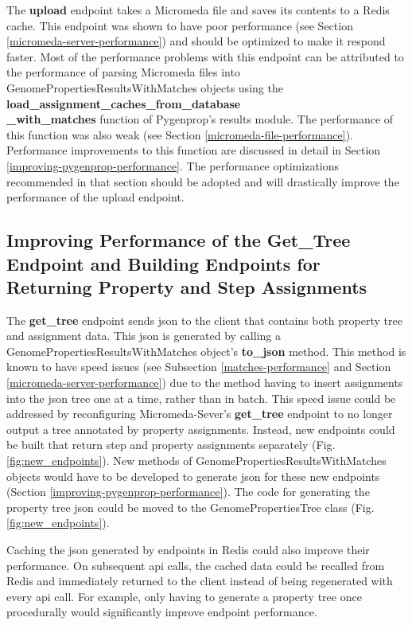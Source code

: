 The \textbf{upload} endpoint takes a Micromeda file and saves its contents to a Redis cache. This endpoint was shown to have poor performance (see Section \ref{micromeda-server-performance}) and should be optimized to make it respond faster. Most of the performance problems with this endpoint can be attributed to the performance of parsing Micromeda files into GenomePropertiesResultsWithMatches objects using the \textbf{load\_assignment\_caches\_from\_database \\ \_with\_matches} function of Pygenprop's results module. The performance of this function was also weak (see Section \ref{micromeda-file-performance}). Performance improvements to this function are discussed in detail in Section \ref{improving-pygenprop-performance}. The performance optimizations recommended in that section should be adopted and will drastically improve the performance of the upload endpoint.

\subsection{Improving Performance of the Get\_Tree Endpoint and Building Endpoints for Returning Property and Step Assignments} \label{assignment-endpoints}

The \textbf{get\_tree} endpoint sends \gls{json} to the client that contains both property tree and assignment data. This \gls{json} is generated by calling a GenomePropertiesResultsWithMatches object's \textbf{to\_json} method. This method is known to have speed issues (see Subsection \ref{matches-performance} and Section \ref{micromeda-server-performance}) due to the method having to insert assignments into the \gls{json} tree one at a time, rather than in batch. This speed issue could be addressed by reconfiguring Micromeda-Sever's \textbf{get\_tree} endpoint to no longer output a tree annotated by property assignments. Instead, new endpoints could be built that return step and property assignments separately (Fig. \ref{fig:new_endpoints}). New methods of GenomePropertiesResultsWithMatches objects would have to be developed to generate \gls{json} for these new endpoints (Section \ref{improving-pygenprop-performance}). The code for generating the property tree \gls{json} could be moved to the GenomePropertiesTree class (Fig. \ref{fig:new_endpoints}).

Caching the \gls{json} generated by endpoints in Redis could also improve their performance. On subsequent \gls{api} calls, the cached data could be recalled from Redis and immediately returned to the client instead of being regenerated with every \gls{api} call. For example, only having to generate a property tree once procedurally would significantly improve endpoint performance.

